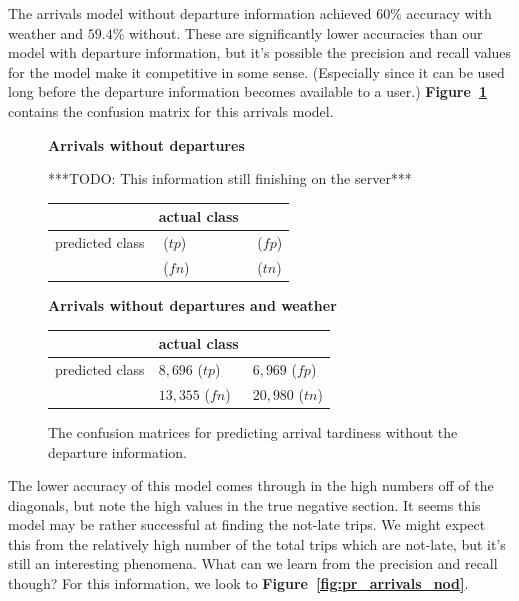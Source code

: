 \documentclass[11pt]{article} %
\begin{document}
The arrivals model without departure information achieved $60\%$ accuracy with
weather and $59.4\%$ without.  These are significantly lower accuracies than
our model with departure information, but it's possible the precision and recall
values for the model make it competitive in some sense. (Especially since it can
be used long before the departure information becomes available to a user.)
\textbf{Figure~\ref{fig:confusion_arrivals_nod}} contains the confusion matrix 
for this arrivals model.

\begin{figure}
    \textbf{Arrivals without departures}

    ***TODO: This information still finishing on the server***

    \begin{tabular}[h]{l|ll}
                         & actual class &  \\
         \hline
         predicted class & $ $ ($tp$)& $ $ ($fp$)\\
                         & $ $ ($fn$)& $ $ ($tn$)\\
    \end{tabular}

    \textbf{Arrivals without departures and weather}

    \begin{tabular}[h]{l|ll}
                         & actual class &  \\
         \hline
         predicted class & $8,696$ ($tp$)& $6,969$ ($fp$)\\
                         & $13,355$ ($fn$)& $20,980$ ($tn$)\\
    \end{tabular}
    \caption{The confusion matrices for predicting arrival tardiness without
    the departure information.}
    \label{fig:confusion_arrivals_nod}
\end{figure}

The lower accuracy of this model comes through in the high numbers off of the 
diagonals, but note the high values in the true negative section. It seems this
model may be rather successful at finding the not-late trips. We might expect 
this from the relatively high number of the total trips which are not-late, but
it's still an interesting phenomena.
What can we learn from the precision and recall though? For this information,
we look to \textbf{Figure~\ref{fig:pr_arrivals_nod}}.
\end{document}
